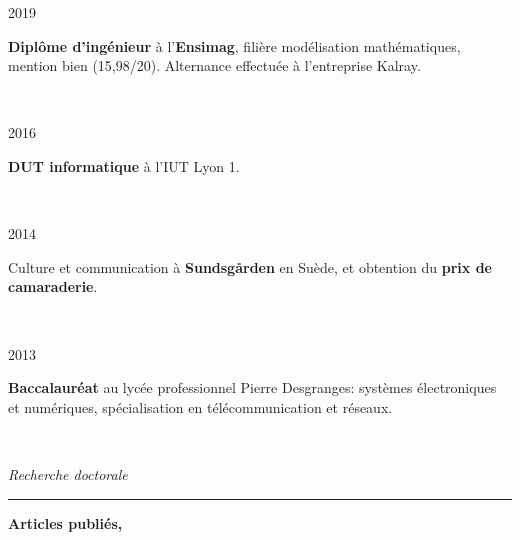 \documentclass[a4paper,10pt, french]{article}
\begin{document}
\noindent
\begin{minipage}{0.20\textwidth}
	\color{MyGray} 2019
\end{minipage}
\hfill
\begin{minipage}{0.70\textwidth}
	\textbf{Diplôme d'ingénieur} à l'\textbf{Ensimag}, filière modélisation mathématiques, mention bien (15,98/20). Alternance effectuée à l'entreprise Kalray.%
\end{minipage}\\
\vspace{2mm}

\noindent
\begin{minipage}{0.20\textwidth}
	\color{MyGray} 2016
\end{minipage}
\hfill
\begin{minipage}{0.70\textwidth}
	\textbf{DUT informatique} à l'IUT Lyon 1.
\end{minipage}\\
\vspace{2mm}

\noindent
\begin{minipage}{0.20\textwidth}
	\color{MyGray} 2014
\end{minipage}
\hfill
\begin{minipage}{0.70\textwidth}
	Culture et communication à \textbf{Sundsgården} en Suède, et obtention du \textbf{prix de camaraderie}.
\end{minipage}\\
\vspace{2mm}

\noindent
\begin{minipage}{0.20\textwidth}
	\color{MyGray} 2013
\end{minipage}
\hfill
\begin{minipage}{0.70\textwidth}
	\textbf{Baccalauréat} au lycée professionnel Pierre Desgranges: systèmes électroniques et numériques, spécialisation en télécommunication et réseaux.
\end{minipage}\\
\vspace{5mm}

\noindent
\textit{\Large \color{MyGray} \hspace{5mm} Recherche doctorale}
\vspace{2mm}
{\color{DefaultGray}\hrule height .1pt}
\vspace{4mm}

\textbf{Articles publiés,}
\nocite{*}


\vspace{5mm}
\end{document}
